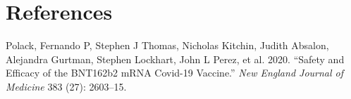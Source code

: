 \documentclass[
  letterpaper,
  DIV=11,
  numbers=noendperiod]{scrreprt}
\newlength{\cslhangindent}
\newenvironment{CSLReferences}[2] %
 {\begin{list}{}{%
  \setlength{\itemindent}{0pt}
  \setlength{\leftmargin}{0pt}
  \setlength{\parsep}{0pt}
  \ifodd #1
   \setlength{\leftmargin}{\cslhangindent}
   \setlength{\itemindent}{-1\cslhangindent}
  \fi
  \setlength{\itemsep}{#2\baselineskip}}}
 {\end{list}}
\theoremstyle{definition}
\theoremstyle{definition}
\theoremstyle{plain}
\theoremstyle{remark}
\begin{document}

\chapter*{References}\label{references}


\label{refs}
\begin{CSLReferences}{1}{0}
Polack, Fernando P, Stephen J Thomas, Nicholas Kitchin, Judith Absalon,
Alejandra Gurtman, Stephen Lockhart, John L Perez, et al. 2020.
{``Safety and Efficacy of the BNT162b2 mRNA Covid-19 Vaccine.''}
\emph{New England Journal of Medicine} 383 (27): 2603--15.

\end{CSLReferences}
\end{document}
